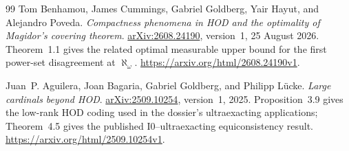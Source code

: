 \documentclass[11pt,letterpaper]{article}
\theoremstyle{definition}
\numberwithin{equation}{section}
\newcommand{\Izero}{\mathrm{I0}}
\newcommand{\arxiv}[1]{\href{https://arxiv.org/abs/#1}{arXiv:#1}}
\begin{document}
\begin{thebibliography}{99}
Tom Benhamou, James Cummings, Gabriel Goldberg, Yair Hayut,
and Alejandro Poveda.
\emph{Compactness phenomena in HOD and the optimality of Magidor's covering theorem}.
\arxiv{2608.24190}, version~1, 25 August 2026.
Theorem~1.1 gives the related optimal measurable upper bound for the first
power-set disagreement at $\aleph_\omega$.
\url{https://arxiv.org/html/2608.24190v1}.

Juan~P. Aguilera, Joan Bagaria, Gabriel Goldberg, and Philipp L\"ucke.
\emph{Large cardinals beyond HOD}.
\arxiv{2509.10254}, version~1, 2025.
Proposition~3.9 gives the low-rank HOD coding used in the dossier's
ultraexacting applications; Theorem~4.5 gives the published
$\Izero$--ultraexacting equiconsistency result.
\url{https://arxiv.org/html/2509.10254v1}.

\end{thebibliography}
\end{document}
